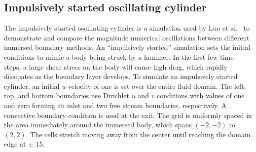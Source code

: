 \documentclass[preprint,12pt]{elsarticle}
\begin{document}
\subsection{Impulsively started oscillating cylinder}
\label{sec:osccylinder}

The impulsively started oscillating cylinder is a simulation used by Luo et al.~\cite{Luo:2012gx}
to demonstrate and compare the magnitude numerical oscillations between different immersed boundary methods.
An ``impulsively started'' simulation sets the initial conditions to mimic a body being struck by a hammer.
In the first few time steps, a large shear stress on the body will cause high drag,
which rapidly dissipates as the boundary layer develops. To simulate an impulsively started
cylinder, an initial $u$-velocity of one is set over the entire fluid domain.
The left, top, and bottom boundaries use Dirichlet $u$ and $v$ conditions with values of
one and zero forming an inlet and two free stream boundaries, respectively.
A convective boundary condition is used at the exit.
The grid is uniformly spaced in the area immediately around the immersed body,
which spans $(-2,-2)$ to $(2,2)$. The cells stretch moving away from the center
until reaching the domain edge at $\pm$ 15.
\end{document}
